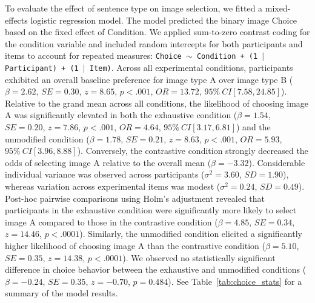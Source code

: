 \documentclass[a4paper, ruler]{CUP-JNL-LIN}%
\begin{document}
To evaluate the effect of sentence type on image selection, we fitted a mixed-effects logistic regression model. The model predicted the binary image Choice based on the fixed effect of Condition. We applied sum-to-zero contrast coding for the condition variable and included random intercepts for both participants and items to account for repeated measures: \texttt{Choice $\sim$ Condition + (1 $\mid$ Participant) + (1 $\mid$ Item)}. 
Across all experimental conditions, participants exhibited an overall baseline preference for image type A over image type B ($\beta = 2.62$, $SE = 0.30$, $z = 8.65$, $p < .001$, $OR = 13.72$, $95\% \ CI [7.58, 24.85]$). Relative to the grand mean across all conditions, the likelihood of choosing image A was significantly elevated in both the exhaustive condition ($\beta = 1.54$, $SE = 0.20$, $z = 7.86$, $p < .001$, $OR = 4.64$, $95\% \ CI [3.17, 6.81]$) and the unmodified condition ($\beta = 1.78$, $SE = 0.21$, $z = 8.63$, $p < .001$, $OR = 5.93$, $95\% \ CI [3.96, 8.88]$). Conversely, the contrastive condition strongly decreased the odds of selecting image A relative to the overall mean ($\beta = -3.32$). Considerable individual variance was observed across participants ($\sigma^2 = 3.60$, $SD = 1.90$), whereas variation across experimental items was modest ($\sigma^2 = 0.24$, $SD = 0.49$). Post-hoc pairwise comparisons using Holm's adjustment revealed that participants in the exhaustive condition were significantly more likely to select image A compared to those in the contrastive condition ($\beta = 4.85$, $SE = 0.34$, $z = 14.46$, $p < .0001$). Similarly, the unmodified condition elicited a significantly higher likelihood of choosing image A than the contrastive condition ($\beta = 5.10$, $SE = 0.35$, $z = 14.38$, $p < .0001$). We observed no statistically significant difference in choice behavior between the exhaustive and unmodified conditions ($\beta = -0.24$, $SE = 0.35$, $z = -0.70$, $p = 0.484$). See Table~\ref{tab:choice_stats} for a summary of the model results.
\end{document}
